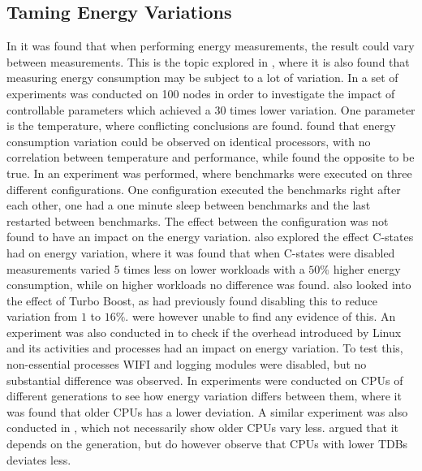 \subsection{Taming Energy Variations}

In \cite{biksbois} it was found that when performing energy measurements, the result could vary between measurements. This is the topic explored in \cite{Ournani2020}, where it is also found that measuring energy consumption may be subject to a lot of variation. In \cite{Ournani2020} a set of experiments was conducted on 100 nodes in order to investigate the impact of controllable parameters which achieved a $30$ times lower variation. One parameter is the temperature, where conflicting conclusions are found. \cite{Kistowski2016} found that energy consumption variation could be observed on identical processors, with no correlation between temperature and performance, while \cite{Wang2018} found the opposite to be true. In \cite{Ournani2020} an experiment was performed, where benchmarks were executed on three different configurations. One configuration executed the benchmarks right after each other, one had a one minute sleep between benchmarks and the last restarted between benchmarks. The effect between the configuration was not found to have an impact on the energy variation. \cite{Ournani2020} also explored the effect C-states had on energy variation, where it was found that when C-states were disabled measurements varied 5 times less on lower workloads with a $50\%$ higher energy consumption, while on higher workloads no difference was found. \cite{Ournani2020} also looked into the effect of Turbo Boost, as \cite{Acun2016} had previously found disabling this to reduce variation from $1$ to $16\%$. \cite{Ournani2020} were however unable to find any evidence of this. An experiment was also conducted in \cite{Ournani2020} to check if the overhead introduced by Linux and its activities and processes had an impact on energy variation. To test this, non-essential processes WIFI and logging modules were disabled, but no substantial difference was observed. In \cite{Marathe2017, Wang2019} experiments were conducted on CPUs of different generations to see how energy variation differs between them, where it was found that older CPUs has a lower deviation. A similar experiment was also conducted in \cite{Ournani2020}, which not necessarily show older CPUs vary less. \cite{Ournani2020} argued that it depends on the generation, but do however observe that CPUs with lower TDBs deviates less.